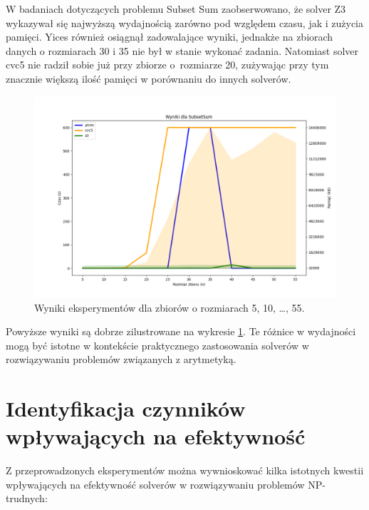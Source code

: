 W badaniach dotyczących problemu Subset Sum zaobserwowano, że solver Z3 wykazywał się najwyższą wydajnością zarówno pod względem czasu, jak i zużycia pamięci. Yices również osiągnął zadowalające wyniki, jednakże na zbiorach danych o rozmiarach 30 i 35 nie był w stanie wykonać zadania. Natomiast solver cvc5 nie radził sobie już przy zbiorze o~rozmiarze 20, zużywając przy tym znacznie większą ilość pamięci w porównaniu do innych solverów. 

\begin{figure}[htbp]
	\centering
	\begin{minipage}{\textwidth}
		\includegraphics[width=\textwidth]{./figures/8-plot.png}
		\caption{Wyniki eksperymentów dla zbiorów o rozmiarach 5, 10, \dots, 55.}
		\label{fig:8}
	\end{minipage}
\end{figure}

Powyższe wyniki są dobrze zilustrowane na wykresie \ref{fig:8}. Te różnice w wydajności mogą być istotne w kontekście praktycznego zastosowania solverów w rozwiązywaniu problemów związanych z arytmetyką.

\section{Identyfikacja czynników wpływających na efektywność}

Z przeprowadzonych eksperymentów można wywnioskować kilka istotnych kwestii wpływających na efektywność solverów w rozwiązywaniu problemów NP-trudnych:

